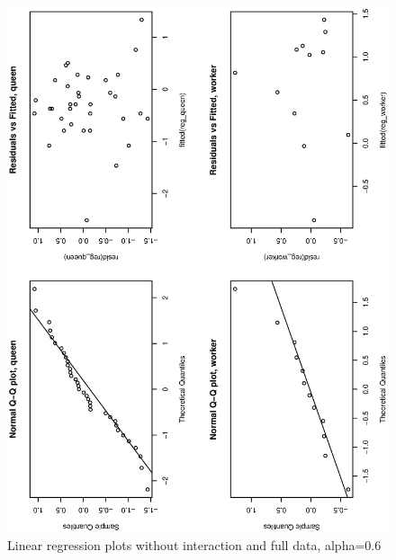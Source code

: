 \documentclass[a4paper,10pt]{article}
\begin{document}
\begin{figure}
\includegraphics[angle=-90, width=1\textwidth]{figures/math650_hw8_fig2_alpha0_6.eps}
\caption{Linear regression plots without interaction and full data, alpha=0.6}\label{f6}
\end{figure}
\end{document}
